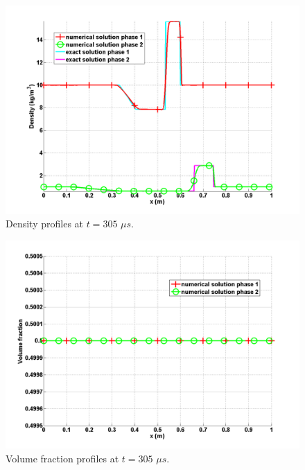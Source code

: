 \begin{figure}[H]
\centering
\includegraphics[width=\textwidth]{figures/SEM/two_phases_density.png}
\caption{Density profiles at $t=305$ $\mu s$.}
\label{fig:two-indep-fluids-dens-7-eqn-sect4}
\end{figure}
%
\begin{figure}[H]
\centering
\includegraphics[width=\textwidth]{figures/SEM/two_phases_volume_fraction.png}
\caption{Volume fraction profiles at $t=305$ $\mu s$.}
\label{fig:two-indep-fluids-vf-7-eqn-sect4}
\end{figure}
%
